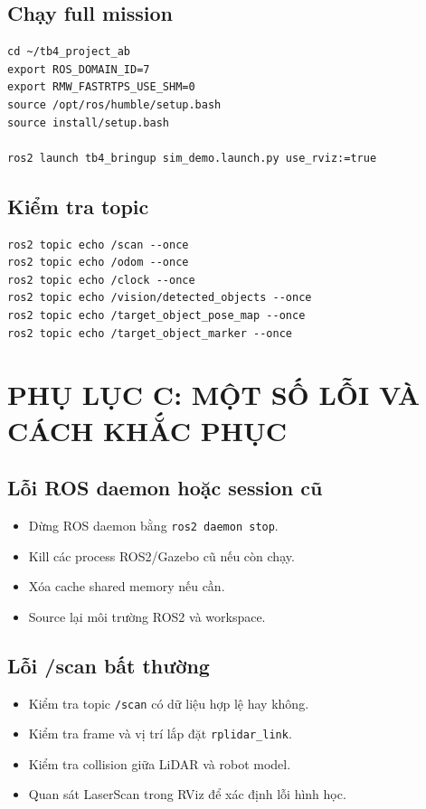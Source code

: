 \subsection*{Chạy full mission}
\begin{lstlisting}
cd ~/tb4_project_ab
export ROS_DOMAIN_ID=7
export RMW_FASTRTPS_USE_SHM=0
source /opt/ros/humble/setup.bash
source install/setup.bash

ros2 launch tb4_bringup sim_demo.launch.py use_rviz:=true
\end{lstlisting}

\subsection*{Kiểm tra topic}
\begin{lstlisting}
ros2 topic echo /scan --once
ros2 topic echo /odom --once
ros2 topic echo /clock --once
ros2 topic echo /vision/detected_objects --once
ros2 topic echo /target_object_pose_map --once
ros2 topic echo /target_object_marker --once
\end{lstlisting}

\newpage
\section*{PHỤ LỤC C: MỘT SỐ LỖI VÀ CÁCH KHẮC PHỤC}

\subsection*{Lỗi ROS daemon hoặc session cũ}
\begin{itemize}
    \item Dừng ROS daemon bằng \texttt{ros2 daemon stop}.
    \item Kill các process ROS2/Gazebo cũ nếu còn chạy.
    \item Xóa cache shared memory nếu cần.
    \item Source lại môi trường ROS2 và workspace.
\end{itemize}

\subsection*{Lỗi /scan bất thường}
\begin{itemize}
    \item Kiểm tra topic \texttt{/scan} có dữ liệu hợp lệ hay không.
    \item Kiểm tra frame và vị trí lắp đặt \texttt{rplidar\_link}.
    \item Kiểm tra collision giữa LiDAR và robot model.
    \item Quan sát LaserScan trong RViz để xác định lỗi hình học.
\end{itemize}

